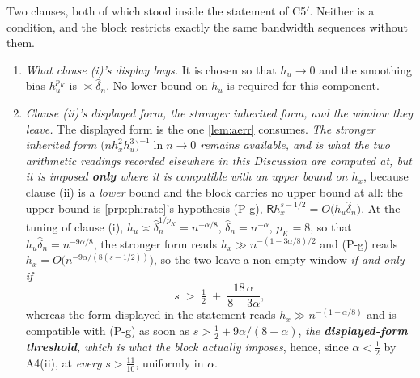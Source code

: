 \begin{remark}\label{rem:app5read}
Two clauses, both of which stood inside the statement of C5$'$. Neither is a condition, and the
block restricts exactly the same bandwidth sequences without them.
\begin{enumerate}
\item[(1)] \emph{What clause \textup{(i)}'s display buys.} It is chosen so that $h_u\to0$ and the smoothing
bias $h_u^{p_K}$ is $\asymp\hat\delta_n$. No lower bound on $h_u$ is required for this component.
\item[(2)] \emph{Clause \textup{(ii)}'s displayed form, the stronger inherited form, and the window they
leave.} The displayed form is the one \cref{lem:aerr} consumes. \emph{The stronger inherited form
$\big(nh_x^{2}h_u^{3}\big)^{-1}\ln n\to0$ remains available, and is what the two arithmetic readings
recorded elsewhere in this Discussion are computed at, but it is imposed \textbf{only} where it is
compatible with an upper bound on $h_x$}, because clause (ii) is a \emph{lower} bound and the block
carries no upper bound at
all: the upper bound is \cref{prp:phirate}'s hypothesis (P-g),
$\mathsf R h_x^{s-1/2}=O\big(h_u\hat\delta_n\big)$.
At the tuning of clause (i), $h_u\asymp\hat\delta_n^{1/p_K}=n^{-\alpha/8}$, $\hat\delta_n=n^{-\alpha}$,
$p_K=8$, so that $h_u\hat\delta_n=n^{-9\alpha/8}$, the stronger form reads
$h_x\gg n^{-(1-3\alpha/8)/2}$ and (P-g) reads
$h_x=O\big(n^{-9\alpha/(8(s-1/2))}\big)$, so the two leave a non-empty window \emph{if and only if}
\begin{equation}\label{eq:hxwindow}
s\;>\;\tfrac12\;+\;\frac{18\,\alpha}{8-3\alpha} ,
\end{equation}
whereas the form displayed in the statement reads $h_x\gg n^{-(1-\alpha/8)}$ and is compatible with (P-g)
as soon as
$s>\tfrac12+9\alpha/(8-\alpha)$, \emph{the \textbf{displayed-form threshold}, which is what the block
actually imposes}, hence, since $\alpha<\tfrac12$ by A4(ii), at \emph{every} $s>\tfrac{11}{10}$,
uniformly in $\alpha$.

\end{enumerate}
\end{remark}
